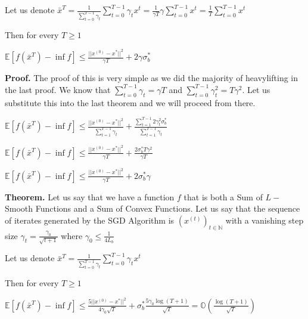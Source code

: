 Let us denote $\bar{x}^T = \frac{1}{\sum_{t = 0}^{T - 1} \gamma_t} \sum_{t = 0}^{T - 1} \gamma_t x^t = \frac{1}{\gamma T} \gamma \sum_{t = 0}^{T - 1} x^t = \frac{1}{T} \sum_{t = 0}^{T - 1} x^t$ \newline 

Then for every $T \geq 1$ \newline 

$\mathbb{E}[f(\bar{x}^T) - \inf f] \leq \frac{||x^{(0)} - x^*||^2}{\gamma T} + 2\gamma \sigma_b^* $ \newline 

\noindent \textbf{Proof.} The proof of this is very simple as we did the majority of heavylifting in the last proof. We know that $\sum_{t = 0}^{T - 1} \gamma_t = \gamma T$ and $\sum_{t = 0}^{T - 1} \gamma_t^2 = T\gamma^2$. Let us substitute this into the last theorem and we will proceed from there. 

$\mathbb{E} [f(\bar{x}^T) - \inf f] \leq \frac{||x^{(0)} - x^*||^2}{\sum_{t = 1}^{T - 1} \gamma_t} + \frac{\sum_{t=1}^{T - 1} 2 \gamma_t^2 \sigma_b^*}{\sum_{t = 1}^{T - 1} \gamma_t}$ \newline

$\mathbb{E} [f(\bar{x}^T) - \inf f] \leq \frac{||x^{(0)} - x^*||^2}{\gamma T} + \frac{2 \sigma_b^* T\gamma^2}{\gamma T}$ \newline

$\mathbb{E} [f(\bar{x}^T) - \inf f] \leq \frac{||x^{(0)} - x^*||^2}{\gamma T} + 2 \sigma_b^* \gamma$ \newline

\noindent \textbf{Theorem.} Let us say that we have a function $f$ that is both a Sum of $L-$Smooth Functions and a Sum of Convex Functions. Let us say that the sequence of iterates generated by the SGD Algorithm is $(x^{(t)})_{t \in \mathbb{N}}$ with a vanishing step size $\gamma_t = \frac{\gamma_0}{\sqrt{t + 1}}$ where $\gamma_0 \leq \frac{1}{4L_{b}}$ 

Let us denote $\bar{x}^T = \frac{1}{\sum_{t = 0}^{T - 1} \gamma_t} \sum_{t = 0}^{T - 1} \gamma_t x^t$ \newline 

Then for every $T \geq 1$ \newline 

$\mathbb{E}[f(\bar{x}^T) - \inf f] \leq \frac{5 ||x^{(0)} - x^*||^2}{4 \gamma_0 \sqrt{T}} + \sigma_b^* \frac{5 \gamma_0 \log{(T + 1)}}{\sqrt{T}} = \mathbb{O}(\frac{\log{(T + 1)}}{\sqrt{T}})$ \newline 

